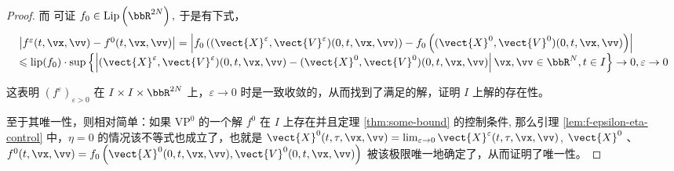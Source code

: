 \begin{proof}
    



而 \lipOffVsphere 可证 $f_{0} \in \operatorname{Lip}\left(\bbR^{2 N}\right),$ 于是有下式，
\[
    \begin{array}{l}
    \left|f^{\varepsilon}(t, \vx, \vv)-f^{0}(t, \vx, \vv)\right|=\left|f_{0}\left((\vect{X}^{\varepsilon},\vect{V}^{\varepsilon})(0, t, \vx, \vv)\right)-f_{0}\left((\vect{X}^{0},\vect{V}^{0})(0, t, \vx, \vv)\right)\right| \\
    \leqslant \operatorname{lip}(f_{0}) \cdot \sup \left\{\left|(\vect{X}^{\varepsilon},\vect{V}^{\varepsilon})(0, t, \vx, \vv)-(\vect{X}^{0},\vect{V}^{0})(0, t, \vx, \vv)\right| \vx, \vv\in \bbR^{N}, t \in I\right\} \rightarrow 0, \varepsilon \rightarrow 0
    \end{array}
    \]

这表明 $\left(f^{\varepsilon}\right)_{\varepsilon>0}$ 在 $I \times I \times \bbR^{2 N}$ 上，$\varepsilon \rightarrow 0$ 时是一致收敛的，从而找到了满足\eqvp 的解，证明 $I$ 上解的存在性。

至于其唯一性，则相对简单：如果 $\text{VP}^{0}$ 的一个解 $f^{0}$ 在 $I$ 上存在并且定理 \ref{thm:some-bound} 的控制条件, 那么引理 \ref{lem:f-epsilon-eta-control} 中，$\eta=0$ 的情况该不等式也成立了，也就是 $\vect{X}^{0}(t, \tau, \vx, \vv)=\lim _{\varepsilon \rightarrow 0} \vect{X}^{\varepsilon}(t, \tau, \vx, \vv) $, $\vect{X}^{0}$ 、$f^{0}(t, \vx, \vv)=f_{0}\left(\vect{X}^{0}(0, t, \vx,\vv), \vect{V}^{0}(0, t, \vx,\vv)\right)$ 被该极限唯一地确定了，从而证明了唯一性。


\end{proof}
